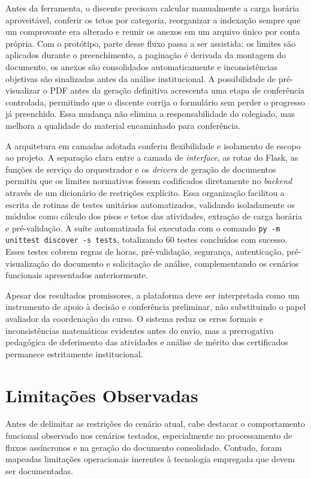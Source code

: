 Antes da ferramenta, o discente precisava calcular manualmente a carga horária aproveitável, conferir os tetos por categoria, reorganizar a indexação sempre que um comprovante era alterado e reunir os anexos em um arquivo único por conta própria. Com o protótipo, parte desse fluxo passa a ser assistida: os limites são aplicados durante o preenchimento, a paginação é derivada da montagem do documento, os anexos são consolidados automaticamente e inconsistências objetivas são sinalizadas antes da análise institucional. A possibilidade de pré-visualizar o PDF antes da geração definitiva acrescenta uma etapa de conferência controlada, permitindo que o discente corrija o formulário sem perder o progresso já preenchido. Essa mudança não elimina a responsabilidade do colegiado, mas melhora a qualidade do material encaminhado para conferência.

A arquitetura em camadas adotada conferiu flexibilidade e isolamento de escopo ao projeto. A separação clara entre a camada de \textit{interface}, as rotas do Flask, as funções de serviço do orquestrador e os \textit{drivers} de geração de documentos permitiu que os limites normativos fossem codificados diretamente no \textit{backend} através de um dicionário de restrições explícito. Essa organização facilitou a escrita de rotinas de testes unitários automatizados, validando isoladamente os módulos como cálculo dos pisos e tetos das atividades, extração de carga horária e pré-validação. A suíte automatizada foi executada com o comando \texttt{py -m unittest discover -s tests}, totalizando 60 testes concluídos com sucesso. Esses testes cobrem regras de horas, pré-validação, segurança, autenticação, pré-visualização do documento e solicitação de análise, complementando os cenários funcionais apresentados anteriormente.

Apesar dos resultados promissores, a plataforma deve ser interpretada como um instrumento de apoio à decisão e conferência preliminar, não substituindo o papel avaliador da coordenação do curso. O sistema reduz os erros formais e inconsistências matemáticas evidentes antes do envio, mas a prerrogativa pedagógica de deferimento das atividades e análise de mérito dos certificados permanece estritamente institucional.

\section{Limitações Observadas}

Antes de delimitar as restrições do cenário atual, cabe destacar o comportamento funcional observado nos cenários testados, especialmente no processamento de fluxos assíncronos e na geração do documento consolidado. Contudo, foram mapeadas limitações operacionais inerentes à tecnologia empregada que devem ser documentadas.


